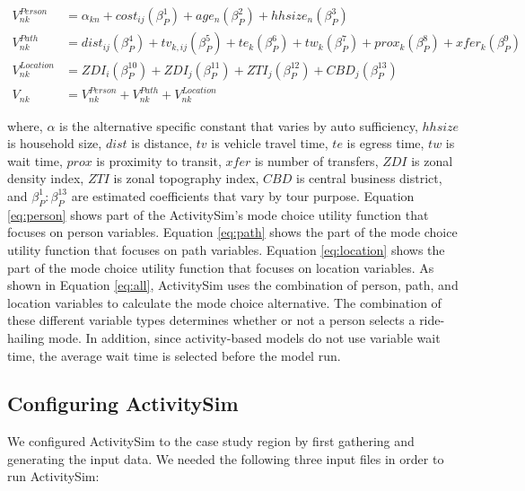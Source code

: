 \documentclass[fancy, masters]{byuthesis}
\begin{document}
\begin{align}
  V_{nk}^{Person} & = \alpha_{kn} + cost_{ij} (\beta_{P}^1) + age_{n} 
  (\beta_{P}^2) + hhsize_{n} (\beta_{P}^3) \label{eq:person} \\
  V_{nk}^{Path} &= dist_{ij} (\beta_{P}^4) + tv_{k,ij} (\beta_{P}^5) + 
      te_{k} (\beta_{P}^6) + tw_{k} (\beta_{P}^7) + 
      prox_{k} (\beta_{P}^8) + xfer_{k} (\beta_{P}^9)  \label{eq:path} \\
  V_{nk}^{Location} &= ZDI_{i} (\beta_{P}^{10}) + ZDI_{j} (\beta_{P}^{11}) + 
      ZTI_{j} (\beta_{P}^{12}) + CBD_{j} (\beta_{P}^{13}) \label{eq:location}\\
  V_{nk} &= V_{nk}^{Person} + V_{nk}^{Path} + V_{nk}^{Location} \label{eq:all}
\end{align}

where, \(\alpha\) is the alternative specific constant that varies by auto sufficiency, \(hhsize\) is household size, \(dist\) is distance, \(tv\) is vehicle travel time, \(te\) is egress time, \(tw\) is wait time, \(prox\) is proximity to transit, \(xfer\) is number of transfers, \(ZDI\) is zonal density index, \(ZTI\) is zonal topography index, \(CBD\) is central business district, and \(\beta_{P}^1:\beta_{P}^{13}\) are estimated coefficients that vary by tour purpose. Equation \eqref{eq:person} shows part of the ActivitySim's mode choice utility function that focuses on person variables. Equation \eqref{eq:path} shows the part of the mode choice utility function that focuses on path variables. Equation \eqref{eq:location} shows the part of the mode choice utility function that focuses on location variables. As shown in Equation \eqref{eq:all}, ActivitySim uses the combination of person, path, and location variables to calculate the mode choice alternative. The combination of these different variable types determines whether or not a person selects a ride-hailing mode. In addition, since activity-based models do not use variable wait time, the average wait time is selected before the model run.

\hypertarget{configuring-activitysim}{%
\subsection{Configuring ActivitySim}\label{configuring-activitysim}}

We configured ActivitySim to the case study region by first gathering and generating the input data. We needed the following three input files in order to run ActivitySim:
\end{document}
